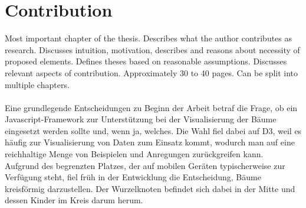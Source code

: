 \chapter{Contribution}

Most important chapter of the thesis. Describes what the author contributes as research. Discusses intuition, motivation, describes and reasons about necessity of proposed elements. Defines theses based on reasonable assumptions. Discusses relevant aspects of contribution. Approximately 30 to 40 pages. Can be split into multiple chapters.
\\\\
Eine grundlegende Entscheidungen zu Beginn der Arbeit betraf die Frage, ob ein Javascript-Framework zur Unterstützung bei der Visualisierung der Bäume eingesetzt werden sollte und, wenn ja, welches. Die Wahl fiel dabei auf D3, weil es häufig zur Visualisierung von Daten zum Einsatz kommt, wodurch man auf eine reichhaltige Menge von Beispielen und Anregungen zurückgreifen kann. 
\\
Aufgrund des begrenzten Platzes, der auf mobilen Geräten typischerweise zur Verfügung steht, fiel früh in der Entwicklung die Entscheidung, Bäume kreisförmig darzustellen. Der Wurzelknoten befindet sich dabei in der Mitte und dessen Kinder im Kreis darum herum.
